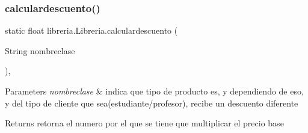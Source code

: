 \mbox{\label{classlibreria_1_1_libreria_a33f2cc093f3c15f09e146283e0c025d7}} 
\subsubsection{\texorpdfstring{calculardescuento()}{calculardescuento()}}
{\footnotesize\ttfamily static float libreria.\+Libreria.\+calculardescuento (\begin{DoxyParamCaption}\item[{String}]{nombreclase }\end{DoxyParamCaption})\hspace{0.3cm}{\ttfamily [inline]}, {\ttfamily [static]}}


\begin{DoxyParams}{Parameters}
{\em nombreclase} & indica que tipo de producto es, y dependiendo de eso, y del tipo de cliente que sea(estudiante/profesor), recibe un descuento diferente \\
\hline
\end{DoxyParams}
\begin{DoxyReturn}{Returns}
retorna el numero por el que se tiene que multiplicar el precio base 
\end{DoxyReturn}

